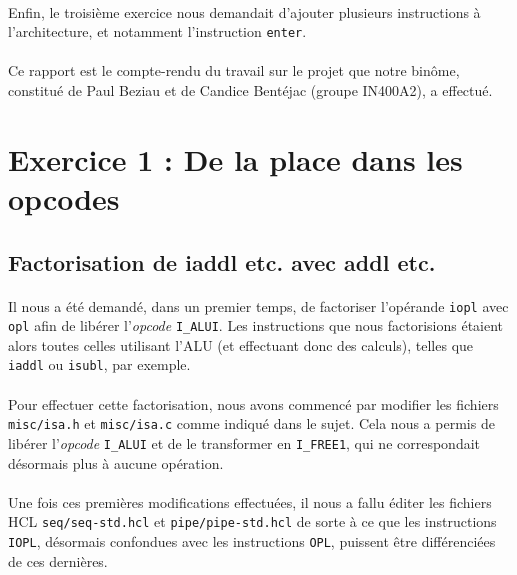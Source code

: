 \documentclass[12pt]{article}
\begin{document}
\paragraph{}Enfin, le troisième exercice nous demandait d'ajouter plusieurs instructions à l'architecture, et notamment l'instruction \verb+enter+.

\paragraph{}Ce rapport est le compte-rendu du travail sur le projet que notre binôme, constitué de Paul Beziau et de Candice Bentéjac (groupe IN400A2), a effectué.

\newpage


\section{Exercice 1 : De la place dans les opcodes}
\subsection{Factorisation de iaddl etc. avec addl etc.}
\paragraph{}Il nous a été demandé, dans un premier temps, de factoriser l'opérande \verb+iopl+ avec \verb+opl+ afin de libérer l'{\itshape opcode} \verb+I_ALUI+. Les instructions que nous factorisions étaient alors toutes celles utilisant l'ALU (et effectuant donc des calculs), telles que \verb+iaddl+ ou \verb+isubl+, par exemple.

\paragraph{}Pour effectuer cette factorisation, nous avons commencé par modifier les fichiers \verb+misc/isa.h+ et \verb+misc/isa.c+ comme indiqué dans le sujet. Cela nous a permis de libérer l'{\itshape opcode} \verb+I_ALUI+ et de le transformer en \verb+I_FREE1+, qui ne correspondait désormais plus à aucune opération.

\paragraph{}Une fois ces premières modifications effectuées, il nous a fallu éditer les fichiers HCL \verb+seq/seq-std.hcl+ et \verb+pipe/pipe-std.hcl+ de sorte à ce que les instructions \verb+IOPL+, désormais confondues avec les instructions \verb+OPL+, puissent être différenciées de ces dernières.
\end{document}

